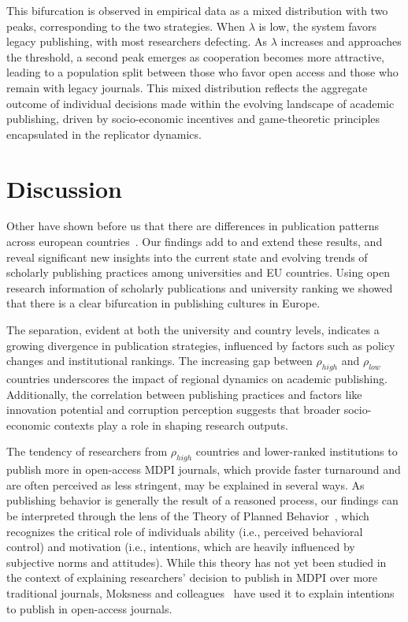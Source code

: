 \documentclass[amsfonts, amssymb, prl, superscriptaddress, notitlepage, twocolumn, nofootinbib]{revtex4-2}
\begin{document}
This bifurcation is observed in empirical data as a mixed distribution with two peaks, corresponding to the two strategies. When $\lambda$ is low, the system favors legacy publishing, with most researchers defecting. As $\lambda$ increases and approaches the threshold, a second peak emerges as cooperation becomes more attractive, leading to a population split between those who favor open access and those who remain with legacy journals. This mixed distribution reflects the aggregate outcome of individual decisions made within the evolving landscape of academic publishing, driven by socio-economic incentives and game-theoretic principles encapsulated in the replicator dynamics.


\section{Discussion}
Other have shown before us that there are differences in publication patterns across european countries~\cite{kulczycki_publication_2018,sasvari2023current,csomos_understanding_2023}. 
Our findings add to and extend these results, and reveal significant new insights into the current state and evolving trends of scholarly publishing practices among universities and EU countries. Using open research information of scholarly publications and university ranking we showed that there is a clear bifurcation in publishing cultures in Europe. 

The separation, evident at both the university and country levels, indicates a growing divergence in publication strategies, influenced by factors such as policy changes and institutional rankings. The increasing gap between $\rho_{high}$ and $\rho_{low}$ countries underscores the impact of regional dynamics on academic publishing. Additionally, the correlation between publishing practices and factors like innovation potential and corruption perception suggests that broader socio-economic contexts play a role in shaping research outputs. 

The tendency of researchers from $\rho_{high}$ countries and lower-ranked institutions to publish more in open-access MDPI journals, which provide faster turnaround and are often perceived as less stringent, may be explained in several ways. As publishing behavior is generally the result of a reasoned process, our findings can be interpreted through the lens of the Theory of Planned Behavior~\cite{ajzen1991}, which recognizes the critical role of individuals ability (i.e., perceived behavioral control) and motivation (i.e., intentions, which are heavily influenced by subjective norms and attitudes). While this theory has not yet been studied in the context of explaining researchers’ decision to publish in MDPI over more traditional journals, Moksness and colleagues~\cite{moksness2020} have used it to explain intentions to publish in open-access journals.
\end{document}
